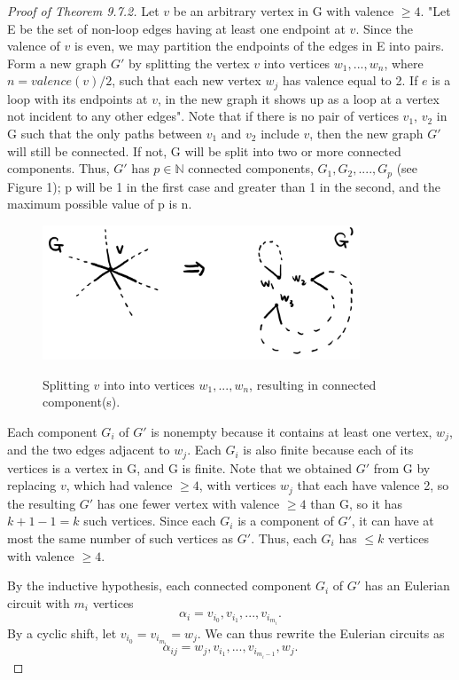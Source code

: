 \begin{proof}[Proof of Theorem 9.7.2]
    Let $v$ be an arbitrary vertex in G with valence $\geq 4$.  "Let E be the set of non-loop edges having at least one endpoint at $v$. Since the valence of $v$ is even, we may partition the endpoints of the edges in E into pairs. Form a new graph $G'$ by splitting the vertex $v$ into vertices $w_1,..., w_n$, where $n=valence(v)/2$, such that each new vertex $w_j$ has valence equal to 2. If $e$ is a loop with its endpoints at $v$, in the new graph it shows up as a loop at a vertex not incident to any other edges"\cite{Taylor}. Note that if there is no pair of vertices $v_1$, $v_2$ in G such that the only paths between $v_1$ and $v_2$ include $v$, then the new graph $G'$ will still be connected. If not, G will be split into two or more connected components. Thus, $G'$ has $p \in \mathbb N$ connected components, $G_1, G_2,....,G_p$ (see Figure 1); p will be 1 in the first case and greater than 1 in the second, and the maximum possible value of p is n.
    
    \begin{figure}[h]
    \centering
    \includegraphics[height=4cm]{Figure1.png}\\
    \caption{Splitting $v$ into into vertices $w_1,..., w_n$, resulting in connected component(s).}
    \end{figure}

    Each component $G_i$ of $G'$ is nonempty because it contains at least one vertex, $w_j$, and the two edges adjacent to $w_j$. Each $G_i$ is also finite because each of its vertices is a vertex in G, and G is finite. Note that we obtained $G'$ from G by replacing $v$, which had valence $\geq 4$, with vertices $w_j$ that each have valence 2, so the resulting $G'$ has one fewer vertex with valence $\geq 4$ than G, so it has $k+1-1=k$ such vertices. Since each $G_i$ is a component of $G'$, it can have at most the same number of such vertices as $G'$. Thus, each $G_i$ has $\leq k$ vertices with valence $\geq 4$.


    By the inductive hypothesis, each connected component $G_i$ of $G'$ has an Eulerian circuit with $m_i$ vertices
    \[
    \alpha_i=v_{i_0}, v_{i_1},...,v_{i_{m_i}}.
    \]
    By a cyclic shift, let $v_{i_0}=v_{i_{m_i}}=w_j$. We can thus rewrite the Eulerian circuits as
    \[
    \alpha_{ij}=w_j, v_{i_1},...,v_{i_{m_i-1}},w_j.
    \]


\end{proof}
